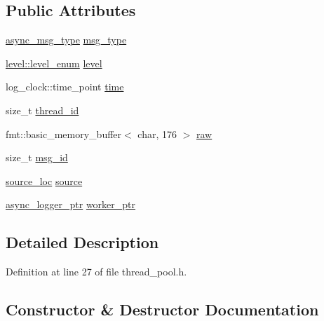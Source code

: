 \subsection*{Public Attributes}
\begin{DoxyCompactItemize}
\item 
\hyperlink{namespacespdlog_1_1details_a22274995cf879a5d0a08d1f7513ee4fb}{async\+\_\+msg\+\_\+type} \hyperlink{structspdlog_1_1details_1_1async__msg_a02c7d8e28bc720dea6552042801a86c0}{msg\+\_\+type}
\item 
\hyperlink{namespacespdlog_1_1level_a35f5227e5daf228d28a207b7b2aefc8b}{level\+::level\+\_\+enum} \hyperlink{structspdlog_1_1details_1_1async__msg_a3e2008e47f70761ff3240ab56a3be370}{level}
\item 
log\+\_\+clock\+::time\+\_\+point \hyperlink{structspdlog_1_1details_1_1async__msg_a00cfea0e28fb046d77da1df09d6410b4}{time}
\item 
size\+\_\+t \hyperlink{structspdlog_1_1details_1_1async__msg_aac1c8c51a83bae076197a384d26b8814}{thread\+\_\+id}
\item 
fmt\+::basic\+\_\+memory\+\_\+buffer$<$ char, 176 $>$ \hyperlink{structspdlog_1_1details_1_1async__msg_a0c3ac027c1ca0c1380210c32219a0370}{raw}
\item 
size\+\_\+t \hyperlink{structspdlog_1_1details_1_1async__msg_a74136620d40e667dbfec1050c8e74179}{msg\+\_\+id}
\item 
\hyperlink{structspdlog_1_1source__loc}{source\+\_\+loc} \hyperlink{structspdlog_1_1details_1_1async__msg_a017a4b18324181e93c1b1606b0158999}{source}
\item 
\hyperlink{namespacespdlog_1_1details_a9b6989c16b6150f7e4658ea2aee01bc2}{async\+\_\+logger\+\_\+ptr} \hyperlink{structspdlog_1_1details_1_1async__msg_a11f8ca9e84e22b61fca4cd7fe88db5aa}{worker\+\_\+ptr}
\end{DoxyCompactItemize}


\subsection{Detailed Description}


Definition at line 27 of file thread\+\_\+pool.\+h.



\subsection{Constructor \& Destructor Documentation}
\mbox{\label{structspdlog_1_1details_1_1async__msg_a1639729ae0bbefc841ec4b87c3369274}} 
